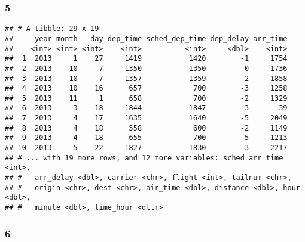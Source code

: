 \documentclass[]{article}
\newenvironment{Shaded}{\begin{snugshade}}{\end{snugshade}}
\newcommand{\DecValTok}[1]{\textcolor[rgb]{0.00,0.00,0.81}{#1}}
\newcommand{\KeywordTok}[1]{\textcolor[rgb]{0.13,0.29,0.53}{\textbf{#1}}}
\newcommand{\NormalTok}[1]{#1}
\newcommand{\OperatorTok}[1]{\textcolor[rgb]{0.81,0.36,0.00}{\textbf{#1}}}
\newcommand{\StringTok}[1]{\textcolor[rgb]{0.31,0.60,0.02}{#1}}
\begin{document}
\hypertarget{section-6}{%
\subsubsection{5}\label{section-6}}

\begin{Shaded}
\end{Shaded}

\begin{verbatim}
## # A tibble: 29 x 19
##     year month   day dep_time sched_dep_time dep_delay arr_time
##    <int> <int> <int>    <int>          <int>     <dbl>    <int>
##  1  2013     1    27     1419           1420        -1     1754
##  2  2013    10     7     1350           1350         0     1736
##  3  2013    10     7     1357           1359        -2     1858
##  4  2013    10    16      657            700        -3     1258
##  5  2013    11     1      658            700        -2     1329
##  6  2013     3    18     1844           1847        -3       39
##  7  2013     4    17     1635           1640        -5     2049
##  8  2013     4    18      558            600        -2     1149
##  9  2013     4    18      655            700        -5     1213
## 10  2013     5    22     1827           1830        -3     2217
## # ... with 19 more rows, and 12 more variables: sched_arr_time <int>,
## #   arr_delay <dbl>, carrier <chr>, flight <int>, tailnum <chr>,
## #   origin <chr>, dest <chr>, air_time <dbl>, distance <dbl>, hour <dbl>,
## #   minute <dbl>, time_hour <dttm>
\end{verbatim}

\hypertarget{section-7}{%
\subsubsection{6}\label{section-7}}

\begin{Shaded}
\end{Shaded}
\end{document}

